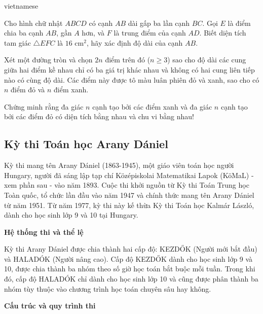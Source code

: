 \documentclass{article}
\begin{document}
\begin{otherlanguage*}{vietnamese}
\begin{problem*}
    Cho hình chữ nhật \( ABCD \) có cạnh \( AB \) dài gấp ba lần cạnh \( BC \). Gọi \( E \) là điểm chia ba cạnh \( AB \), gần \( A \) hơn, và \( F \) là trung điểm của cạnh \( AD \).
    Biết diện tích tam giác \( \triangle EFC \) là \( 16 \) cm\(^2\), hãy xác định độ dài của cạnh \( AB \).
\end{problem*}

\begin{problem*}
    Xét một đường tròn và chọn \( 2n \) điểm trên đó (\( n \geq 3 \)) sao cho độ dài các cung giữa hai điểm kề nhau chỉ có ba giá trị khác nhau
    và không có hai cung liên tiếp nào có cùng độ dài. Các điểm này được tô màu luân phiên đỏ và xanh, sao cho có \( n \) điểm đỏ và \( n \) điểm xanh.  
    
    Chứng minh rằng đa giác \( n \) cạnh tạo bởi các điểm xanh và đa giác \( n \) cạnh tạo bởi các điểm đỏ có diện tích bằng nhau và chu vi bằng nhau!
\end{problem*}

\newpage

\subsection{Kỳ thi Toán học Arany Dániel}

Kỳ thi mang tên Arany Dániel (1863-1945), một giáo viên toán học người Hungary, người đã sáng lập tạp chí Középiskolai Matematikai Lapok (KöMaL) - xem phần sau - vào năm 1893.
Cuộc thi khởi nguồn từ Kỳ thi Toán Trung học Toàn quốc, tổ chức lần đầu vào năm 1947 và chính thức mang tên Arany Dániel từ năm 1951.
Từ năm 1977, kỳ thi này kế thừa Kỳ thi Toán học Kalmár László, dành cho học sinh lớp 9 và 10 tại Hungary.

\textbf{Hệ thống thi và thể lệ}

Kỳ thi Arany Dániel được chia thành hai cấp độ: KEZDŐK (Người mới bắt đầu) và HALADÓK (Người nâng cao).
Cấp độ KEZDŐK dành cho học sinh lớp 9 và 10, được chia thành ba nhóm theo số giờ học toán bắt buộc mỗi tuần.
Trong khi đó, cấp độ HALADÓK chỉ dành cho học sinh lớp 10 và cũng được phân thành ba nhóm tùy thuộc vào chương trình học toán chuyên sâu hay không.

\textbf{Cấu trúc và quy trình thi}


\end{otherlanguage*}
\end{document}
